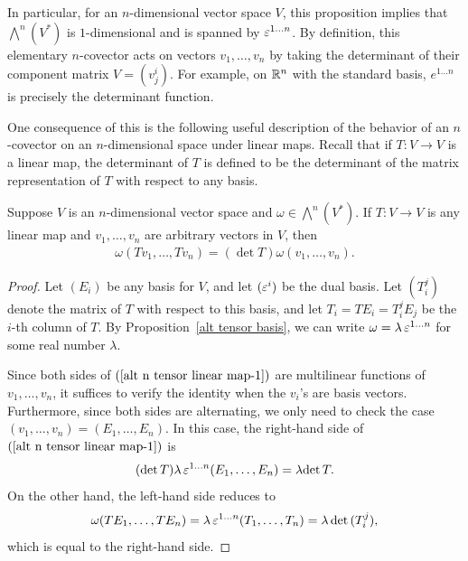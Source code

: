 In particular, for an $n$-dimensional vector space $V$, this proposition implies that $\bigwedge^n(V^*)$ is $1$-dimensional and is spanned by $\varepsilon^{1\dots n}$. By definition, this elementary $n$-covector acts on vectors $v_1,\dots,v_n$ by taking the determinant of their component matrix $V=(v_j^i)$. For example, on $\mathbb{R}^n$ with the standard basis, $e^{1\dots n}$ is precisely the determinant function.\par
One consequence of this is the following useful description of the behavior of an
$n$-covector on an $n$-dimensional space under linear maps. Recall that if $T:V\to V$
is a linear map, the determinant of $T$ is defined to be the determinant of the matrix representation of $T$ with respect to any basis.
\begin{proposition}\label{alt n tensor linear map}
Suppose $V$ is an $n$-dimensional vector space and $\omega\in\bigwedge^n(V^*)$. If $T:V\to V$ is any linear map and $v_1,\dots,v_n$ are arbitrary vectors in $V$, then
\begin{align}\label{alt n tensor linear map-1}
\omega(Tv_1,\dots,Tv_n)=(\det T)\omega(v_1,\dots,v_n).
\end{align}
\end{proposition}
\begin{proof}
Let $(E_i)$ be any basis for $V$, and let $(\varepsilon^i)$ be the dual basis. Let $(T_i^j)$ denote the matrix of $T$ with respect to this basis, and let $T_i=TE_i=T_i^jE_j$ 
be the $i$-th column of $T$. By Proposition~\ref{alt tensor basis}, we can write $\omega=\lambda\,\varepsilon^{1\dots n}$ for some real number $\lambda$.\par
Since both sides of $(\ref{alt n tensor linear map-1})$ are multilinear functions of $v_1,\dots,v_n$, it suffices to verify the identity when the $v_i$'s are basis 
vectors. Furthermore, since both sides are alternating, we only need to check the case $(v_1,\dots,v_n)=(E_1,\dots,E_n)$. In this case, the right-hand side of 
$(\ref{alt n tensor linear map-1})$ is
\[(\mathrm{det}\, T)\lambda\,\varepsilon^{1\dots n}(E_1,\dots,E_n)=\lambda\mathrm{det}\, T.\]
On the other hand, the left-hand side reduces to
\[\omega(TE_1,\dots,TE_n)=\lambda\,\varepsilon^{1\dots n}(T_1,\dots,T_n)=\lambda\,\mathrm{det}\,(T_i^j),\]
which is equal to the right-hand side.
\end{proof}
